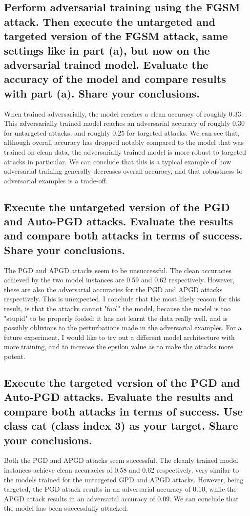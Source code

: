 \documentclass{article}
\begin{document}
\subsection{Perform adversarial training using the FGSM attack. Then execute
the untargeted and targeted version of the FGSM attack, same settings like in
part (a), but now on the adversarial trained model. Evaluate the accuracy of
the model and compare results with part (a). Share your conclusions.}
When trained adversarially, the model reaches a clean accuracy of roughly 0.33.
This adversarially trained model reaches an adversarial accuracy of roughly 0.30 for untargeted attacks, and roughly 0.25 for targeted attacks.
We can see that, although overall accuracy has dropped notably compared to the model that was trained on clean data, the adversarially trained model is more robust to targeted attacks in particular.
We can conclude that this is a typical example of how adversarial training generally decreases overall accuracy, and that robustness to adversarial examples is a trade-off.

\subsection{Execute the untargeted version of the PGD and Auto-PGD attacks.
Evaluate the results and compare both attacks in terms of success. Share your
conclusions.}
The PGD and APGD attacks seem to be unsuccessful.
The clean accuracies achieved by the two model instances are 0.59 and 0.62 respectively.
However, these are also the adversarial accuracies for the PGD and APGD attacks respectively.
This is unexpected.
I conclude that the most likely reason for this result, is that the attacks cannot "fool" the model, because the model is too "stupid" to be properly fooled; it has not learnt the data really well, and is possibly oblivious to the perturbations made in the adversarial examples.
For a future experiment, I would like to try out a different model architecture with more training, and to increase the epsilon value as to make the attacks more potent.

\subsection{Execute the targeted version of the PGD and Auto-PGD attacks.
Evaluate the results and compare both attacks in terms of success. Use class
cat (class index 3) as your target. Share your conclusions.}
Both the PGD and APGD attacks seem successful.
The cleanly trained model instances achieve clean accuracies of 0.58 and 0.62 respectively, very similar to the models trained for the untargeted GPD and APGD attacks.
However, being targeted, the PGD attack results in an adversarial accuracy of 0.10, while the APGD attack results in an adversarial accuracy of 0.09.
We can conclude that the model has been successfully attacked.
\end{document}
